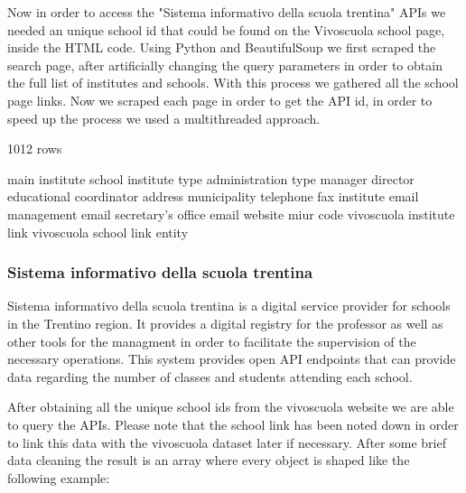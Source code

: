 Now in order to access the "Sistema informativo della scuola trentina" APIs we needed an unique school id that could be found on the Vivoscuola school page, inside the HTML code.
Using Python and BeautifulSoup we first scraped the search page, after artificially changing the query parameters in order to obtain the full list of institutes and schools.
With this process we gathered all the school page links. Now we scraped each page in order to get the API id, in order to speed up the process we used a multithreaded approach.

1012 rows

main institute
school
institute type
administration type
manager
director
educational coordinator
address
municipality
telephone
fax
institute email
management email
secretary's office email
website
miur code
vivoscuola institute link
vivoscuola school link
entity


\subsubsection{Sistema informativo della scuola trentina}
Sistema informativo della scuola trentina is a digital service provider for schools in the Trentino region. It provides a digital registry for the professor as well as other tools for the managment in order to facilitate the supervision of the necessary operations.
This system provides open API endpoints that can provide data regarding the number of classes and students attending each school. 

After obtaining all the unique school ids from the vivoscuola website we are able to query the APIs. Please note that the school link has been noted down in order to link this data with the vivoscuola dataset later if necessary.
After some brief data cleaning the result is an array where every object is shaped like the following example:

